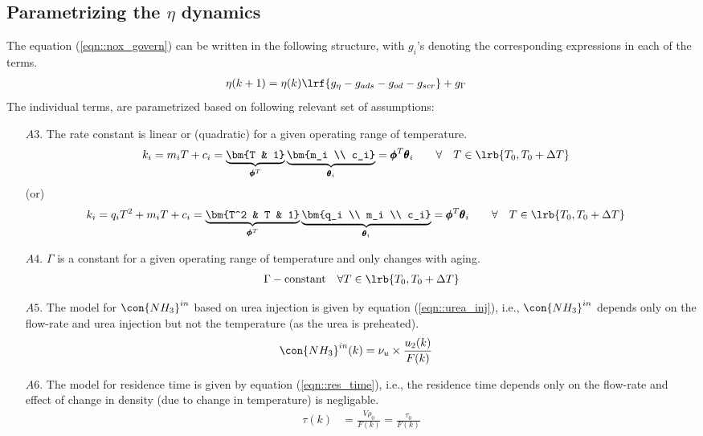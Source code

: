 \subsection{Parametrizing the $\eta$ dynamics}
The equation (\ref{eqn::nox_govern}) can be written in the following structure, with $g_i$'s denoting the corresponding expressions in each of the terms.
\begin{align}
        \eta(k+1) &= \eta(k) \lrf{ g_{\eta} - g_{ads} - g_{od} - g_{scr}} + g_\Gamma
\end{align}
The individual terms, are parametrized based on following relevant set of assumptions:
\begin{itemize}
        \item[$A3.$] The rate constant is linear or (quadratic) for a given operating range of temperature.
        \begin{align}
                k_i &= m_i T + c_i = \underbrace{\bm{T & 1}}_{\pmb \phi^T} \underbrace{\bm{m_i \\ c_i}}_{\pmb \theta_i}
                        = \pmb \phi^{T} \pmb \theta_i
                \qquad \forall \quad T \in \lrb{T_0, T_0 + \Delta T}
                \label{eqn::k_mdl}
        \end{align}
        (or)
        \begin{align}
                k_i &= q_iT^2 + m_i T + c_i = \underbrace{\bm{T^2 & T & 1}}_{\pmb \phi^T} \underbrace{\bm{q_i \\ m_i \\ c_i}}_{\pmb \theta_i}
                        = \pmb \phi^{T} \pmb \theta_i
                \qquad \forall \quad T \in \lrb{T_0, T_0 + \Delta T}
        \end{align}
        \item[$A4.$] $\Gamma$ is a constant for a given operating range of temperature and only changes with aging.
        \begin{align}
                \Gamma - \text{constant} \quad \forall T \in \lrb{T_0, T_0 + \Delta T}
                \label{eqn::gamma_mdl}
        \end{align}
        \item[$A5.$] The model for $\con{NH_3}^{in}$ based on urea injection is given by equation (\ref{eqn::urea_inj}), i.e., $\con{NH_3}^{in}$ depends only on the flow-rate and urea injection but not the temperature (as the urea is preheated).
        \begin{align}
                \con{NH_3}^{in}(k) &= \nu_u \times \frac{u_2(k)}{F(k)}
                \label{eqn::urea_mdl}
        \end{align}
        \item[$A6.$] The model for residence time is given by equation (\ref{eqn::res_time}), i.e., the residence time depends only on the flow-rate and effect of change in density (due to change in temperature) is negligable.
        \begin{align}
                \tau(k) &= \frac{V \rho_0}{F(k)} = \frac{\tau_0}{F(k)}
                \label{eqn::residence_time_mdl}
        \end{align}
\end{itemize}

